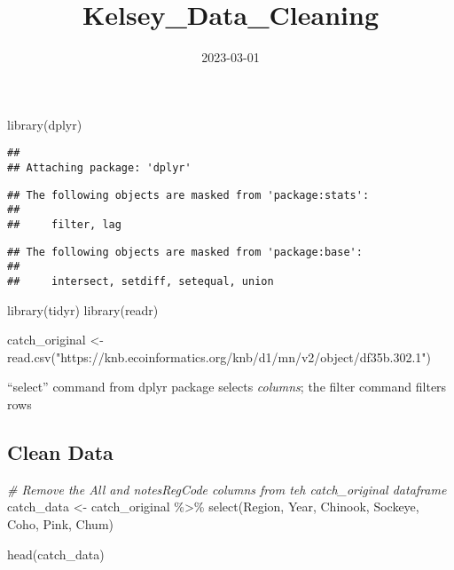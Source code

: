 \documentclass[
]{article}
\title{Kelsey\_Data\_Cleaning}
\author{}
\date{\vspace{-2.5em}2023-03-01}
\newenvironment{Shaded}{\begin{snugshade}}{\end{snugshade}}
\newcommand{\CommentTok}[1]{\textcolor[rgb]{0.56,0.35,0.01}{\textit{#1}}}
\newcommand{\FunctionTok}[1]{\textcolor[rgb]{0.00,0.00,0.00}{#1}}
\newcommand{\NormalTok}[1]{#1}
\newcommand{\OtherTok}[1]{\textcolor[rgb]{0.56,0.35,0.01}{#1}}
\newcommand{\SpecialCharTok}[1]{\textcolor[rgb]{0.00,0.00,0.00}{#1}}
\newcommand{\StringTok}[1]{\textcolor[rgb]{0.31,0.60,0.02}{#1}}
\begin{document}
\maketitle

\begin{Shaded}
\begin{Highlighting}[]
\FunctionTok{library}\NormalTok{(dplyr)}
\end{Highlighting}
\end{Shaded}

\begin{verbatim}
## 
## Attaching package: 'dplyr'
\end{verbatim}

\begin{verbatim}
## The following objects are masked from 'package:stats':
## 
##     filter, lag
\end{verbatim}

\begin{verbatim}
## The following objects are masked from 'package:base':
## 
##     intersect, setdiff, setequal, union
\end{verbatim}

\begin{Shaded}
\begin{Highlighting}[]
\FunctionTok{library}\NormalTok{(tidyr)}
\FunctionTok{library}\NormalTok{(readr)}
\end{Highlighting}
\end{Shaded}

\begin{Shaded}
\begin{Highlighting}[]
\NormalTok{catch\_original }\OtherTok{\textless{}{-}} \FunctionTok{read.csv}\NormalTok{(}\StringTok{"https://knb.ecoinformatics.org/knb/d1/mn/v2/object/df35b.302.1"}\NormalTok{)}
\end{Highlighting}
\end{Shaded}

``select'' command from dplyr package selects \emph{columns}; the filter
command filters rows

\hypertarget{clean-data}{%
\subsection{Clean Data}\label{clean-data}}

\begin{Shaded}
\begin{Highlighting}[]
\CommentTok{\# Remove the All and notesRegCode columns from teh catch\_original dataframe}
\NormalTok{catch\_data }\OtherTok{\textless{}{-}}\NormalTok{ catch\_original }\SpecialCharTok{\%\textgreater{}\%}
  \FunctionTok{select}\NormalTok{(Region, Year, Chinook, Sockeye, Coho, Pink, Chum)}

\FunctionTok{head}\NormalTok{(catch\_data)}
\end{Highlighting}
\end{Shaded}
\end{document}
